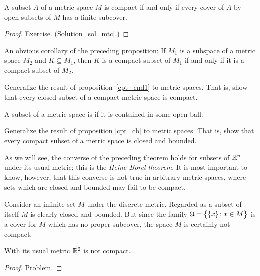 \begin{prop}\label{mtc} A subset $A$ of a metric space $M$ is compact if and only if every
cover of $A$ by open subsets of $M$ has a finite subcover.
\end{prop}

\begin{proof} Exercise.  (Solution~\ref{sol_mtc}.)
  \ns \end{proof}

An obvious corollary of the preceding proposition: If $M_1$ is a subspace of a metric space
$M_2$ and $K \subseteq M_1$, then $K$ is a compact subset of $M_1$ if and only if it is a
compact subset of $M_2$.

\begin{prob}\label{CPT_cnd1} Generalize the result of proposition~\ref{cpt_cnd1} to metric
spaces.  That is, show that every closed subset of a compact metric space is compact.
\end{prob}

\begin{defn} A subset of a metric space is
 if it is contained in some open ball.
\end{defn}

\begin{prob}\label{cpt_clbdd} Generalize the result of proposition \ref{cpt_cb} to metric
spaces. That is, show that every compact subset of a metric space is closed and bounded.
\end{prob}

As we will see, the converse of the preceding theorem holds for subsets of $\mathbb{R}^n$ under its
usual metric; this is the \emph{Heine-Borel theorem}. It is most important to know, however,
that this converse is not true in arbitrary metric spaces, where sets which are closed and
bounded may fail to be compact.

\begin{exam} Consider an infinite set $M$ under the discrete metric.  Regarded as a subset
of itself $M$ is clearly closed and bounded. But since the family $\mathfrak{U} = \bigl\{\{x\}
\colon x \in M \bigr\}$ is a cover for $M$ which has no proper subcover, the space $M$ is
certainly not compact.
\end{exam}

\begin{exam} With its usual metric $\mathbb{R}^2$ is not compact.
\end{exam}

\begin{proof} Problem.  \ns  \end{proof}

